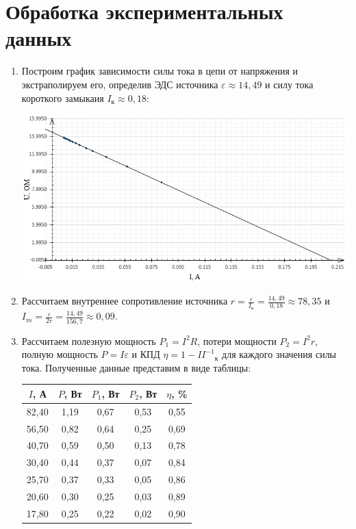 \documentclass[12pt]{article}
\begin{document}
\section*{Обработка экспериментальных данных}
\begin{enumerate}
\item Построим график зависимости силы тока в цепи от напряжения и экстраполируем его, определив ЭДС источника $\varepsilon \approx14,49$ и силу тока короткого замыкаия $I_к\approx0,18$:
\begin{center}
\includegraphics{graph1}
\end{center}
\item Рассчитаем внутреннее сопротивление источника $r = \frac{\varepsilon}{I_к} = \frac{14,49}{0,18} \approx 78,35$ и $I_m = \frac{\varepsilon}{2r} = \frac{14,49}{156,7} \approx 0,09$. 
\item Рассчитаем полезную мощность $P_1 = I^2R$, потери мощности $P_2 = I^2r$, полную мощность $P = I\varepsilon$ и КПД $\eta = 1 - I {I^{-1}}_к$ для каждого значения силы тока. Полученные данные представим в виде таблицы:
\begin{table}[h!]
\begin{center}
\begin{tabular}{|c|c|c|c|c|}
\hline
$I$, А & $P$, Вт & $P_1$, Вт &  $P_2$, Вт & $\eta$, \% \\
\hline
82,40 & 1,19 & 0,67 & 0,53 & 0,55\\
\hline
56,50 & 0,82 & 0,64 & 0,25 & 0,69\\
\hline
40,70 & 0,59 & 0,50 & 0,13 & 0,78\\
\hline
30,40 & 0,44 & 0,37 & 0,07 & 0,84\\
\hline
25,70 & 0,37 & 0,33 & 0,05 & 0,86\\
\hline
20,60 & 0,30 & 0,25 & 0,03 & 0,89\\
\hline
17,80 & 0,25 & 0,22 & 0,02 & 0,90\\

\end{tabular}
\end{center}
\end{table}
\end{enumerate}
\end{document}
